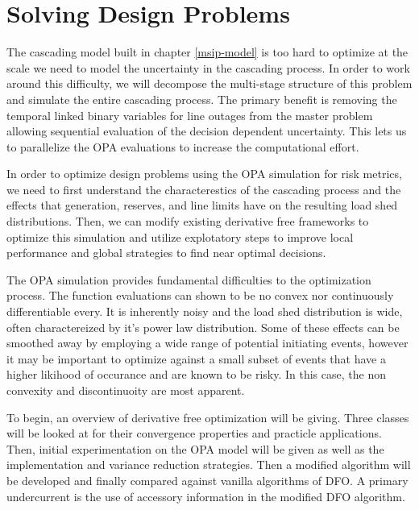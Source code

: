 \newcommand{\mypathdfo}{../thesis/dfo}
\newcommand{\mypathdfodata}{../thesis/dfo/data}
\newcommand{\scd}{\cD_\oplus}
\newcommand{\btu}{\bigtriangleup}
\chapter{Solving Design Problems}

The cascading model built in chapter \ref{msip-model} is too hard to optimize at the scale we need to model the uncertainty in the cascading process.  In order to work around this difficulty, we will decompose the multi-stage structure of this problem and simulate the entire cascading process.  The primary benefit is removing the temporal linked binary variables for line outages from the master problem allowing sequential evaluation of the decision dependent uncertainty.  This lets us to parallelize the OPA evaluations to increase the computational effort.

In order to optimize design problems using the OPA simulation for risk metrics, we need to first understand the characterestics of the cascading process and the effects that generation, reserves, and line limits have on the resulting load shed distributions.  Then, we can modify existing derivative free frameworks to optimize this simulation and utilize explotatory steps to improve local performance and global strategies to find near optimal decisions.

The OPA simulation provides fundamental difficulties to the optimization process.  The function evaluations can shown to be no convex nor continuously differentiable every.  It is inherently noisy and the load shed distribution is wide, often charactereized by it's power law distribution.  Some of these effects can be smoothed away by employing a wide range of potential initiating events, however it may be important to optimize against a small subset of events that have a higher likihood of occurance and are known to be risky.  In this case, the non convexity and discontinuoity are most apparent.

To begin, an overview of derivative free optimization will be giving.  Three classes will be looked at for their convergence properties and practicle applications.  Then, initial experimentation on the OPA model will be given as well as the implementation and variance reduction strategies.  Then a modified algorithm will be developed and finally compared against vanilla algorithms of DFO.  A primary undercurrent is the use of accessory information in the modified DFO algorithm.


